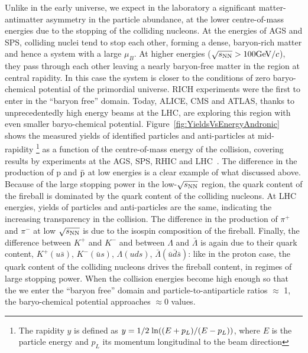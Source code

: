 Unlike in the early universe, we expect in the laboratory a significant matter-antimatter 
asymmetry in the particle abundance, at the lower centre-of-mass energies due to the
stopping of the colliding nucleons. 
At the energies of AGS and SPS, colliding nuclei tend to stop each other, forming a 
dense, baryon-rich matter and hence a system with a large $\mu_{B}$. At higher 
energies ($\sqrt{s_{\rm NN}} > 100 \mathrm{GeV}/c$), they pass through each other leaving a nearly 
baryon-free matter in the region at central rapidity. In this case the system is closer 
to the conditions of zero baryo-chemical potential of the primordial universe. 
RICH experiments were the first to enter in the  ``baryon free'' domain. Today, ALICE, 
CMS and ATLAS, thanks to unprecedentedly high energy beams at the LHC, are 
exploring this region with even smaller baryo-chemical potential. 
Figure~\ref{fig:YieldsVsEnergyAndronic} shows the measured yields of identified 
particles and anti-particles at mid-rapidity \footnote{The rapidity $y$ is defined as 
\mbox{$y = 1/2 \; {\rm ln}((E+p_{L})/(E-p_{L}))$}, where $E$ is the particle energy 
and $p_{L}$ its momentum longitudinal to the beam direction} as a function of the 
centre-of-mass energy of the collision, covering results by experiments at the 
AGS, SPS, RHIC and LHC~\cite{Andronic:2014zha}. The difference in the production 
of p and $\bar{\rm p}$ at low energies is a clear example of what discussed above. 
Because of the large stopping power in the low-$\sqrt{s_{\rm NN}}$ region, the quark content of
 the fireball is dominated by the quark content of the colliding nucleons. At LHC 
 energies, yields of particles and anti-particles are the same, 
 indicating the increasing transparency in the collision. 
The difference in the production of $\pi^+$ and $\pi^-$ at low $\sqrt{s_{\rm NN}}$ is due to the 
isospin composition of the fireball. Finally, the difference between $K^+$ and $K^-$ 
and between $\Lambda$ and $\bar{\Lambda}$ is again due to their quark content, 
$K^+ (u\bar{s})$, $K^- (\bar{u}s)$, $\Lambda (uds)$, $\bar{\Lambda} (\bar
{u}\bar{d}\bar{s})$: like in the proton case, the quark content of the colliding nucleons
drives the fireball content, in regimes of large stopping power. When the collision energies become 
high enough so that the we enter the ``baryon free'' domain and particle-to-antiparticle ratios $\approx$ 1,
the baryo-chemical potential approaches $\approx 0$ values.


